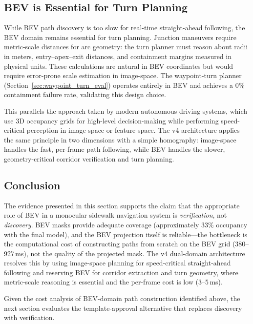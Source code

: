 \documentclass[12pt,letterpaper,oneside]{report}
\begin{document}
\subsection{BEV is Essential for Turn Planning}

While BEV path discovery is too slow for real-time straight-ahead following, the BEV domain remains essential for turn planning.  Junction maneuvers require metric-scale distances for arc geometry: the turn planner must reason about radii in meters, entry--apex--exit distances, and containment margins measured in physical units.  These calculations are natural in BEV coordinates but would require error-prone scale estimation in image-space.  The waypoint-turn planner (Section~\ref{sec:waypoint_turn_eval}) operates entirely in BEV and achieves a 0\% containment failure rate, validating this design choice.

This parallels the approach taken by modern autonomous driving systems, which use 3D occupancy grids for high-level decision-making while performing speed-critical perception in image-space or feature-space.  The v4 architecture applies the same principle in two dimensions with a simple homography: image-space handles the fast, per-frame path following, while BEV handles the slower, geometry-critical corridor verification and turn planning.

\subsection{Conclusion}

The evidence presented in this section supports the claim that the appropriate role of BEV in a monocular sidewalk navigation system is \emph{verification}, not \emph{discovery}.  BEV masks provide adequate coverage (approximately 33\% occupancy with the final model), and the BEV projection itself is reliable---the bottleneck is the computational cost of constructing paths from scratch on the BEV grid (380--927\,ms), not the quality of the projected mask.  The v4 dual-domain architecture resolves this by using image-space planning for speed-critical straight-ahead following and reserving BEV for corridor extraction and turn geometry, where metric-scale reasoning is essential and the per-frame cost is low (3--5\,ms).

Given the cost analysis of BEV-domain path construction identified above, the next section evaluates the template-approval alternative that replaces discovery with verification.
\end{document}
